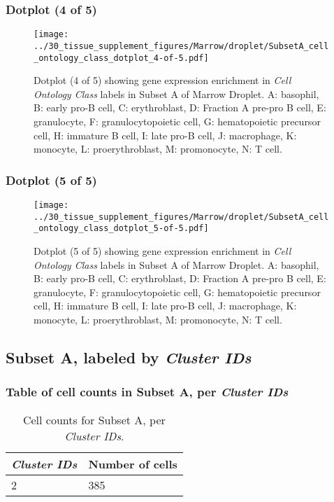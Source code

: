 \clearpage

\subsubsection{Dotplot (4 of 5)}
\begin{figure}[h]
\centering
\texttt{[image: ../30\_tissue\_supplement\_figures/Marrow/droplet/SubsetA\_cell\_ontology\_class\_dotplot\_4-of-5.pdf]}

\caption{ Dotplot (4 of 5)  showing gene expression enrichment in \emph{Cell Ontology Class} labels in Subset A of Marrow Droplet. A: basophil, B: early pro-B cell, C: erythroblast, D: Fraction A pre-pro B cell, E: granulocyte, F: granulocytopoietic cell, G: hematopoietic precursor cell, H: immature B cell, I: late pro-B cell, J: macrophage, K: monocyte, L: proerythroblast, M: promonocyte, N: T cell.}
\end{figure}


\clearpage

\subsubsection{Dotplot (5 of 5)}
\begin{figure}[h]
\centering
\texttt{[image: ../30\_tissue\_supplement\_figures/Marrow/droplet/SubsetA\_cell\_ontology\_class\_dotplot\_5-of-5.pdf]}

\caption{ Dotplot (5 of 5)  showing gene expression enrichment in \emph{Cell Ontology Class} labels in Subset A of Marrow Droplet. A: basophil, B: early pro-B cell, C: erythroblast, D: Fraction A pre-pro B cell, E: granulocyte, F: granulocytopoietic cell, G: hematopoietic precursor cell, H: immature B cell, I: late pro-B cell, J: macrophage, K: monocyte, L: proerythroblast, M: promonocyte, N: T cell.}
\end{figure}


\clearpage

\subsection{Subset A, labeled by \emph{Cluster IDs}}
\subsubsection{Table of cell counts in Subset A, per \emph{Cluster IDs}}\begin{table}[h]
\centering
\label{my-label}
\begin{tabular}{@{}ll@{}}
\toprule

\emph{Cluster IDs}& Number of cells \\ \midrule
2 & 385 \\
\bottomrule
\end{tabular}
\caption{Cell counts for Subset A, per \emph{Cluster IDs}.}
\end{table}

